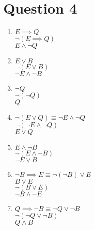 \documentclass{article}
\begin{document}
    \section*{Question 4}
    \begin{enumerate}
    \item 
    $E \implies Q$ \\
    $\neg (E \implies Q)$ \\
    $E \land \neg Q$ \\
    \item 
    $E \lor B$ \\
    $\neg (E \lor B)$ \\
    $\neg E \land \neg B$ \\
    \item 
    $\neg Q$ \\
    $\neg (\neg Q)$ \\
    $Q$ \\
    \item 
    $\neg (E \lor Q) \equiv \neg E \land \neg Q$ \\
    $\neg(\neg E \land \neg Q)$ \\
    $E \lor Q$ \\
    \item 
    $E \land \neg B$ \\
    $\neg (E \land \neg B)$ \\
    $\neg E \lor B$ \\
    \item 
    $\neg B \implies E \equiv \neg (\neg B) \lor E$ \\
    $B \lor E$ \\
    $\neg(B \lor E)$ \\
    $\neg B \land \neg E$
    \item 
    $Q \implies \neg B \equiv \neg Q \lor \neg B$ \\
    $\neg (\neg Q \lor \neg B)$ \\
    $Q \land B$ \\
    \end{enumerate}
     \newpage
\end{document}
